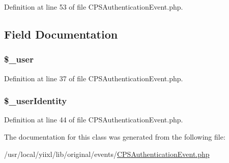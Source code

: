 Definition at line 53 of file CPSAuthenticationEvent.php.








\subsection{Field Documentation}
\hypertarget{classCPSAuthenticationEvent_a5df5982b9dadc74df05081972cd67fdf}{
\subsubsection[{\$\_\-user}]{\setlength{\rightskip}{0pt plus 5cm}\$\_\-user}}
\label{classCPSAuthenticationEvent_a5df5982b9dadc74df05081972cd67fdf}


Definition at line 37 of file CPSAuthenticationEvent.php.

\hypertarget{classCPSAuthenticationEvent_a5f35952d5eb7619bff965559762344e3}{
\subsubsection[{\$\_\-userIdentity}]{\setlength{\rightskip}{0pt plus 5cm}\$\_\-userIdentity}}
\label{classCPSAuthenticationEvent_a5f35952d5eb7619bff965559762344e3}


Definition at line 44 of file CPSAuthenticationEvent.php.



The documentation for this class was generated from the following file:\begin{DoxyCompactItemize}
\item 
/usr/local/yiixl/lib/original/events/\hyperlink{CPSAuthenticationEvent_8php}{CPSAuthenticationEvent.php}\end{DoxyCompactItemize}
